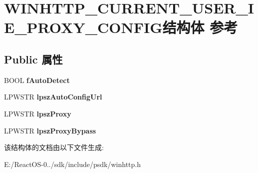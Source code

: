 \hypertarget{struct_w_i_n_h_t_t_p___c_u_r_r_e_n_t___u_s_e_r___i_e___p_r_o_x_y___c_o_n_f_i_g}{}\section{W\+I\+N\+H\+T\+T\+P\+\_\+\+C\+U\+R\+R\+E\+N\+T\+\_\+\+U\+S\+E\+R\+\_\+\+I\+E\+\_\+\+P\+R\+O\+X\+Y\+\_\+\+C\+O\+N\+F\+I\+G结构体 参考}
\label{struct_w_i_n_h_t_t_p___c_u_r_r_e_n_t___u_s_e_r___i_e___p_r_o_x_y___c_o_n_f_i_g}
\subsection*{Public 属性}
\begin{DoxyCompactItemize}
\item 
\mbox{\label{struct_w_i_n_h_t_t_p___c_u_r_r_e_n_t___u_s_e_r___i_e___p_r_o_x_y___c_o_n_f_i_g_acbc303c417f24ac673c71d2759b26c1f}} 
B\+O\+OL {\bfseries f\+Auto\+Detect}
\item 
\mbox{\label{struct_w_i_n_h_t_t_p___c_u_r_r_e_n_t___u_s_e_r___i_e___p_r_o_x_y___c_o_n_f_i_g_a61a30d0931063657d3396aab2d3de458}} 
L\+P\+W\+S\+TR {\bfseries lpsz\+Auto\+Config\+Url}
\item 
\mbox{\label{struct_w_i_n_h_t_t_p___c_u_r_r_e_n_t___u_s_e_r___i_e___p_r_o_x_y___c_o_n_f_i_g_aaac24eb737483996bc8bfe035be11122}} 
L\+P\+W\+S\+TR {\bfseries lpsz\+Proxy}
\item 
\mbox{\label{struct_w_i_n_h_t_t_p___c_u_r_r_e_n_t___u_s_e_r___i_e___p_r_o_x_y___c_o_n_f_i_g_ad4265d3ad83d239aa80419b0145a1d86}} 
L\+P\+W\+S\+TR {\bfseries lpsz\+Proxy\+Bypass}
\end{DoxyCompactItemize}


该结构体的文档由以下文件生成\+:\begin{DoxyCompactItemize}
\item 
E\+:/\+React\+O\+S-\/0../sdk/include/psdk/winhttp.\+h\end{DoxyCompactItemize}
